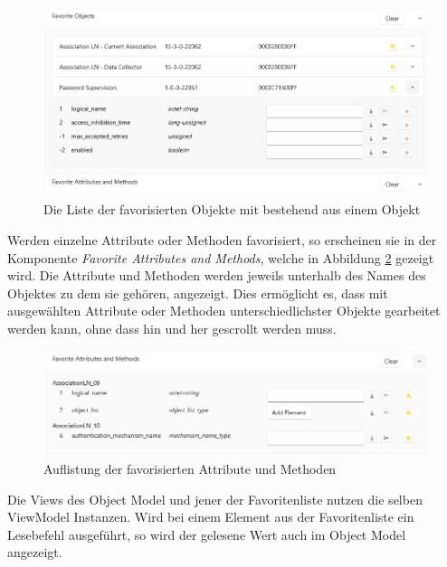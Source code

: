 \begin{figure}
   \centering
   \includegraphics[width=1.0\textwidth]{gfx/favoritesUi.png}
   \caption{
      Die Liste der favorisierten Objekte mit bestehend aus einem Objekt
      }
   \label{fig:favoritesUi}
\end{figure}

Werden einzelne Attribute oder Methoden favorisiert, so erscheinen sie in der Komponente \textit{Favorite Attributes and Methods}, welche in Abbildung \ref{fig:favoriteAttribtuesAndMethods} gezeigt wird.
Die Attribute und Methoden werden jeweils unterhalb des Names des Objektes zu dem sie gehören, angezeigt.
Dies ermöglicht es, dass mit ausgewählten Attribute oder Methoden unterschiedlichster Objekte gearbeitet werden kann, ohne dass hin und her gescrollt werden muss.
\begin{figure}
   \centering
   \includegraphics[width=1.0\textwidth]{gfx/favoriteAttributeAndMethods.png}
   \caption{
     Auflistung der favorisierten Attribute und Methoden
      }
   \label{fig:favoriteAttribtuesAndMethods}
\end{figure}

Die Views des Object Model und jener der Favoritenliste nutzen die selben ViewModel Instanzen.
Wird bei einem Element aus der Favoritenliste ein Lesebefehl ausgeführt, so wird der gelesene Wert auch im Object Model angezeigt.